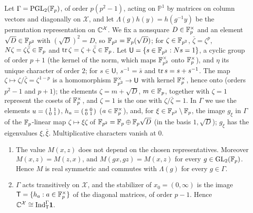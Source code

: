 Let $\Gamma=\mathrm{PGL}_2(\mathbb F_p)$, of order $p(p^2-1)$, acting on $\mathbb P^1$
by matrices on column vectors and diagonally on $\mathcal X$, and let
$\Lambda(g)h(y)=h(g^{-1}y)$ be the permutation representation on
$\mathbb C^{\mathcal X}$. We fix a nonsquare $D\in\mathbb F_p^\times$ and an element
$\sqrt D\in\mathbb F_{p^2}$ with $(\sqrt D)^2=D$, so $\mathbb F_{p^2}=\mathbb F_p(\sqrt D)$; for
$\zeta\in\mathbb F_{p^2}$, $\bar\zeta=\zeta^p$, $N\zeta=\zeta\bar\zeta\in\mathbb F_p$ and
$\operatorname{tr}\zeta=\zeta+\bar\zeta\in\mathbb F_p$. Let $\mathsf U=\{s\in\mathbb F_{p^2}:Ns=1\}$, a
cyclic group of order $p+1$ (the kernel of the norm, which maps
$\mathbb F_{p^2}^\times$ onto $\mathbb F_p^\times$), and $\eta$ its unique character of order
$2$; for $s\in\mathsf U$, $s^{-1}=\bar s$ and $\operatorname{tr} s=s+s^{-1}$. The map
$\zeta\mapsto\zeta/\bar\zeta=\zeta^{1-p}$ is a homomorphism
$\mathbb F_{p^2}^\times\to\mathsf U$ with kernel $\mathbb F_p^\times$, hence onto (orders
$p^2-1$ and $p+1$); the elements $\zeta=m+\sqrt D$, $m\in\mathbb F_p$, together with
$\zeta=1$ represent the cosets of $\mathbb F_p^\times$, and $\zeta=1$ is the one with
$\zeta/\bar\zeta=1$. In $\Gamma$ we use the elements
$u=\begin{psmallmatrix}1&1\\0&1\end{psmallmatrix}$,
$h_a=\begin{psmallmatrix}a&0\\0&1\end{psmallmatrix}$ ($a\in\mathbb F_p^\times$), and,
for $\xi\in\mathbb F_{p^2}\setminus\mathbb F_p$, the image $g_\xi$ in $\Gamma$ of the
$\mathbb F_p$-linear map $\zeta\mapsto\xi\zeta$ of $\mathbb F_{p^2}=\mathbb F_p\oplus\mathbb F_p\sqrt D$ (in
the basis $1,\sqrt D$); $g_\xi$ has the eigenvalues $\xi,\bar\xi$.
Multiplicative characters vanish at $0$.

\begin{lemma}[Invariance]\label{lem:dl:invariance}
\begin{enumerate}[label=\textup{(\alph*)}]
\item The value $M(x,z)$ does not depend on the chosen representatives.
  Moreover $M(x,z)=M(z,x)$, and $M(gx,gz)=M(x,z)$ for every
  $g\in\mathrm{GL}_2(\mathbb F_p)$. Hence $M$ is real symmetric and commutes with
  $\Lambda(g)$ for every $g\in\Gamma$.
\item $\Gamma$ acts transitively on $\mathcal X$, and the stabilizer of
  $x_0=(0,\infty)$ is the image $\mathsf T=\{h_a:a\in\mathbb F_p^\times\}$ of the
  diagonal matrices, of order $p-1$. Hence
  $\mathbb C^{\mathcal X}\cong\mathrm{Ind}_{\mathsf T}^\Gamma\mathbf 1$.
\end{enumerate}
\end{lemma}

